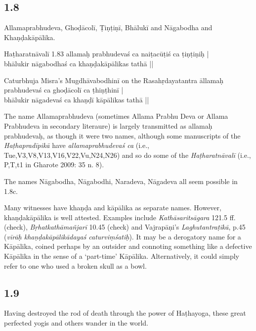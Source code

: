 \begin{ekdosis}
\subsection*{1.8}
\begin{translation}[hp01_008]
Allamaprabhudeva, Ghoḍācolī, Ṭiṇṭiṇī, Bhālukī and Nāgabodha and Khaṇḍakāpālika.
\end{translation}

\begin{testimonia}[hp01_008]
Haṭharatnāvalī 1.83
\startverse
allamaḥ prabhudevaś ca naiṭacūṭiś ca ṭiṇṭiṇiḥ |\\
bhālukir nāgabodhaś ca khaṇḍakāpālikas tathā || 
\endverse

Caturbhuja Misra's Mugdhāvabodhinī on the Rasahṛdayatantra
\startverse
āllamaḥ prabhudevaś ca ghoḍācolī ca ṭhiṇṭhinī |\\
bhālukir nāgadevaś ca khaṇḍī kāpālikas tathā ||
\endverse
\end{testimonia}

\begin{philcomm}[hp01_008]  
The name Allamaprabhudeva (sometimes Allama Prabhu Deva or Allama Prabhudeva in secondary literaure) is largely transmitted as allamaḥ prabhudevaḥ, as though it were two names, although some manuscripts of the \emph{Haṭhapradīpikā} have \emph{allamaprabhudevaś ca} (i.e., Tue,V3,V8,V13,V16,V22,Vu,N24,N26) and so do some of the \emph{Haṭharatnāvalī} (i.e., P,T,t1 in Gharote 2009: 35 n. 8).

The names Nāgabodha, Nāgabodhi, Naradeva, Nāgadeva all seem possible in 1.8c. 

Many witnesses have khaṇḍa and kāpālika as separate names. However, khaṇḍakāpālika is well attested. Examples include \emph{Kathāsaritsāgara} 121.5 ff. (check), \emph{Bṛhatkathāmañjarī} 10.45 (check) and Vajrapāṇi’s \emph{Laghutantraṭīkā}, p.45 (\emph{vīrāḥ khaṇḍakāpālikādayaś caturviṃśatiḥ}). It may be a derogatory name for a Kāpālika, coined perhaps by an outsider and connoting something like a defective Kāpālika in the sense of a `part-time' Kāpālika. Alternatively, it could simply refer to one who used a broken skull as a bowl.
\end{philcomm}

\subsection*{1.9}
\begin{translation}[hp01_009]
Having destroyed the rod of death through the power of Haṭhayoga, these great perfected yogis and others wander in the world.
\end{translation}


\end{ekdosis}
